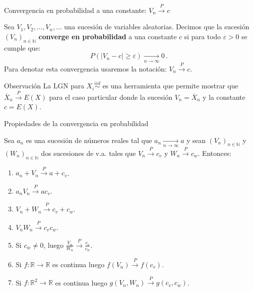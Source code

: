 \documentclass{beamer}
\title{\color{black}{Análisis Estadístico}}
\subtitle{\color{rosee}Convergencia en probabilidad, en media cuadrática y en distribución\\ Propiedades asintóticas de los estimadores}%
\institute[]{UTDT}
\date[UTDT 2022]{}
\theoremstyle{definition}
\newcommand{\NN}{\mathbb{N}}
\newcommand{\ton}{\underset{n\to\infty}{\longrightarrow}}
\newcommand{\cp}{\overset{P}{\rightarrow}}
\begin{document}
\begin{frame}
  \titlepage
\end{frame}


\begin{frame}{\color{rosee}Convergencia en probabilidad a una constante: $V_n \cp c$}
  \begin{definition}
    Sea $V_{1},V_{2},\dots,V_n,\dots$ una sucesión de variables aleatorias. Decimos que la sucesión $(V_n)_{n\in\NN}$ \textbf{converge
      en probabilidad} a una constante $c$ si para todo $\varepsilon>0$ se cumple que:
    \[P\left( \vert V_n - c \vert \geq \varepsilon \right) \ton 0\,.\]
Para denotar esta convergencia usaremos la notaci\'on: $V_n \cp c$.
  \end{definition}
  \begin{alertblock}{\color{rosee}Observaci\'on}
    La LGN  para $X_i\stackrel{iid}{\sim}$ es una herramienta que permite mostrar que $\overline{X}_n\cp E(X)$ para el caso particular donde la sucesión $V_n=\overline{X}_n$ y la constante $c = E(X)$.
  \end{alertblock}
\end{frame}



\begin{frame}{\color{rosee}Propiedades de la convergencia en probabilidad}
  
    Sea $a_n$ es una sucesi\'on de n\'umeros reales tal que
    $a_n\ton a$ y sean $(V_n)_{n\in\NN}$ y $(W_n)_{n\in\NN}$ dos sucesiones de v.a. tales que $V_n \cp c_v$ y     $W_n\cp c_w$. Entonces:\medskip
    \begin{enumerate} 
    \item $a_n+V_n \cp a +c_v$.\smallskip
    \item $a_n V_n \cp a c_v$.\smallskip
    \item $V_n+W_n \cp c_v + c_w$.\smallskip
    \item $V_n W_n \cp c_v c_w$.\smallskip
    \item Si $c_w\neq 0$, luego $\frac{V_n}{W_n} \cp \frac{c_v}{c_w}$.\smallskip
    \item Si $f:\mathbb{R}\to\mathbb{R}$ es continua luego
      $f(V_n) \cp f(c_v)$.\smallskip
    \item Si $f:\mathbb{R}^{2}\to\mathbb{R}$ es continua luego      $g(V_n,W_n) \cp g(c_v,c_w)$.
    \end{enumerate}
  
\end{frame}
\end{document}
